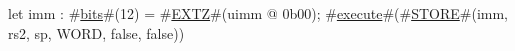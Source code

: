 let imm : #\hyperref[sailRISCVzbits]{bits}#(12) = #\hyperref[sailRISCVzEXTZ]{EXTZ}#(uimm @ 0b00);
#\hyperref[sailRISCVzexecute]{execute}#(#\hyperref[sailRISCVzSTORE]{STORE}#(imm, rs2, sp, WORD, false, false))
